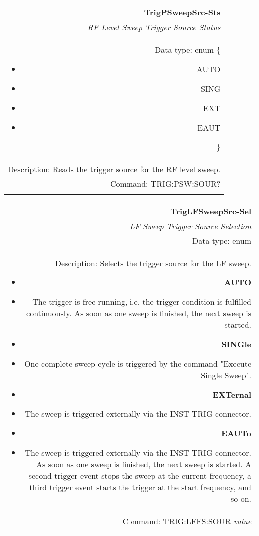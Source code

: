 \documentclass[openany]{article}
\begin{document}
		\begin{tabular}{N}
			\hline
			\bfseries TrigPSweepSrc-Sts \\ \hline
			\emph{RF Level Sweep Trigger Source Status} \\
			Data type: enum \{\begin{itemize}[noitemsep]
				\small
				\item[] AUTO
				\item[] SING
				\item[] EXT
				\item[] EAUT
			\end{itemize}\} \\ 
			Description: Reads the trigger source for the RF level sweep. \\
			Command: TRIG:PSW:SOUR? \\
			\\

		\end{tabular}


		\begin{tabular}{N}
			\hline
			\bfseries TrigLFSweepSrc-Sel \\ \hline
			\emph{LF Sweep Trigger Source Selection} \\
			Data type: enum \\   
			Description: Selects the trigger source for the LF sweep.\begin{itemize}[noitemsep]
				\small
				\item[] \textbf{AUTO}
				\item[] The trigger is free-running, i.e. the trigger condition is fulfilled continuously. As soon as one sweep is finished, the next sweep is started.
                                \item[] \textbf{SINGle}
				\item[] One complete sweep cycle is triggered by the command "Execute Single Sweep".
				\item[] \textbf{EXTernal}
				\item[] The sweep is triggered externally via the INST TRIG connector.
                                \item[] \textbf{EAUTo}
				\item[] The sweep is triggered externally via the INST TRIG connector. As soon as one sweep is finished, the next sweep is started. A second trigger event stops the sweep at the current frequency, a third trigger event starts the trigger at the start frequency, and so on.

			\end{itemize} \\
			Command: TRIG:LFFS:SOUR \emph{value} \\
			\\

		\end{tabular}
\end{document}
